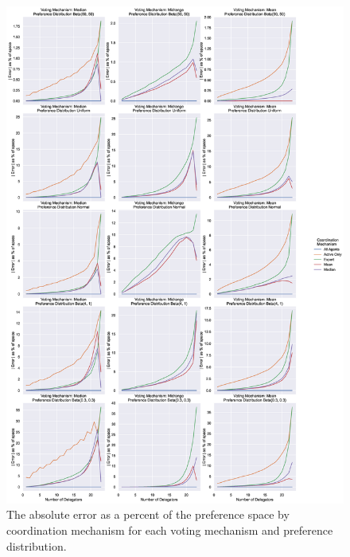%
%

\makeappendix

\renewcommand\thefigure{A.\arabic{figure}}

\begin{figure}[p]
    \centering
    \includegraphics[scale=0.30]
    {content/chapter2/figures/distribution_different_scale_error_as_percent_of_space_abs_mean}
    \caption{
        The absolute error as a percent of the preference space by coordination
        mechanism for each voting mechanism and preference distribution.
    }
    \label{fig:distribution-different-scale-error-as-percent-of-space-abs-mean}
\end{figure}

